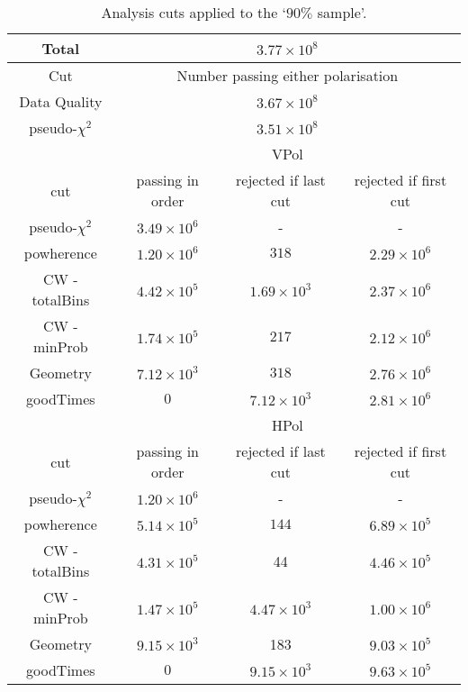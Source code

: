 \begin{table}
  \begin{center}
    \begin{tabular}{ c || c | c | c }
      Total & \multicolumn{3}{c}{ $3.77 \times 10^{8}$}\\
      \hline
      Cut & \multicolumn{3}{c}{ Number passing either polarisation}\\      
      \hline
      Data Quality & \multicolumn{3}{c}{$3.67 \times 10^8$}\\
      pseudo-$\chi^{2}$ & \multicolumn{3}{c}{$3.51 \times 10^8$}\\
      \hline\hline
      & \multicolumn{3}{c}{VPol}\\
      \hline
      cut & passing in order & rejected if last cut & rejected if first cut \\
      \hline
      pseudo-$\chi^{2}$ & $3.49 \times 10^6$ & - & -\\
      powherence & $1.20 \times 10^6$ & $318$ & $2.29 \times 10^6$\\
      CW - totalBins & $4.42 \times 10^5$ & $1.69 \times 10^3$ & $2.37 \times 10^6$\\
      CW - minProb & $1.74 \times 10^5$ & $217$ & $2.12 \times 10^6$\\
      Geometry & $7.12 \times 10^3$ & $318$ & $2.76 \times 10^6$\\
      goodTimes & $0$ & $7.12 \times 10^3$ & $2.81 \times 10^6$\\
      \hline\hline
      & \multicolumn{3}{c}{HPol}\\
      \hline
      cut & passing in order & rejected if last cut & rejected if first cut \\
      \hline
      pseudo-$\chi^{2}$ & $1.20 \times 10^6$ & - & -\\
      powherence & $5.14 \times 10^5$ & $144$ & $6.89 \times 10^5$\\
      CW - totalBins & $4.31 \times 10^5$ & 44 & $4.46 \times 10^5$\\
      CW - minProb & $1.47 \times 10^5$ & $4.47 \times 10^3$ & $1.00 \times 10^6$\\
      Geometry & $9.15 \times 10^3$ & 183 & $9.03 \times 10^5$\\
      goodTimes & $0$ & $9.15 \times 10^3$ & $9.63 \times 10^5$\\      
      \end{tabular} 
    \caption{Analysis cuts applied to the `$90 \%$ sample'.}
    \label{tab:Analysis:Cut-Flow}
  \end{center}
\end{table}

